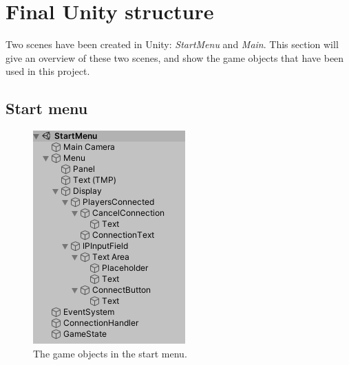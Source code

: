 \section{Final Unity structure}
Two scenes have been created in Unity: \textit{StartMenu} and \textit{Main}.
This section will give an overview of these two scenes, and show the game objects that have been used in this project.

\subsection{Start menu}

\begin{figure}[H]
    \centering
    \includegraphics[width=0.4\linewidth]{figures/startmenu.PNG}
    \caption{The game objects in the start menu.}
    \label{fig:startmenu-game-objects}
\end{figure}

